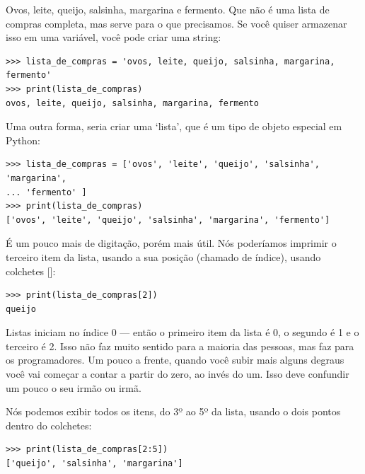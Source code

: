 Ovos, leite, queijo, salsinha, margarina e fermento. Que não é uma lista de compras completa, mas serve para o que precisamos. Se você quiser armazenar isso em uma variável, você pode criar uma string:

\begin{listing}
\begin{verbatim}
>>> lista_de_compras = 'ovos, leite, queijo, salsinha, margarina, fermento'
>>> print(lista_de_compras)
ovos, leite, queijo, salsinha, margarina, fermento
\end{verbatim}
\end{listing}

Uma outra forma, seria criar uma `lista', que é um tipo de objeto especial em Python:

\begin{listing}
\begin{verbatim}
>>> lista_de_compras = ['ovos', 'leite', 'queijo', 'salsinha', 'margarina',
... 'fermento' ]
>>> print(lista_de_compras)
['ovos', 'leite', 'queijo', 'salsinha', 'margarina', 'fermento']
\end{verbatim}
\end{listing}

É um pouco mais de digitação, porém mais útil. Nós poderíamos imprimir o terceiro item da lista, usando a sua posição (chamado de índice), usando colchetes []:

\begin{listing}
\begin{verbatim}
>>> print(lista_de_compras[2])
queijo
\end{verbatim}
\end{listing}

Listas iniciam no índice 0 --- então o primeiro item da lista é 0, o segundo é 1 e o terceiro é 2. Isso não faz muito sentido para a maioria das pessoas, mas faz para os programadores. Um pouco a frente, quando você subir mais alguns degraus você vai começar a contar a partir do zero, ao invés do um. Isso deve confundir um pouco o seu irmão ou irmã.
\par
Nós podemos exibir todos os itens, do 3º ao 5º da lista, usando o dois pontos dentro do colchetes:

\begin{listing}
\begin{verbatim}
>>> print(lista_de_compras[2:5])
['queijo', 'salsinha', 'margarina']
\end{verbatim}
\end{listing}

